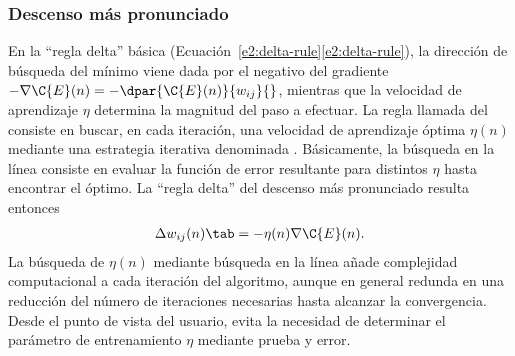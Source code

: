 \subsubsection{Descenso más pronunciado}
%
En la ``regla delta'' básica
(\iflatexml{}Ecuación~\ref{e2:delta-rule}\else\autoref{e2:delta-rule}\fi),
la dirección de búsqueda del mínimo
viene dada por el negativo del gradiente
$-\nabla\C{E}(n)=-\dpar{\C{E}(n)}{w_{ij}}{}$, mientras que la
velocidad de aprendizaje $\eta$ determina la magnitud del paso a
efectuar.
La regla llamada del  consiste
en buscar, en cada iteración, una velocidad de aprendizaje óptima
$\eta(n)$ mediante una estrategia iterativa denominada .  Básicamente, la búsqueda en la línea consiste en evaluar
la función de error resultante para distintos $\eta$ hasta encontrar
el óptimo.  La ``regla delta'' del descenso más pronunciado resulta
entonces
%
\begin{align}\label{e2:delta-rule-steepest}
  \Delta w_{ij}(n)\tab=-\eta(n)\nabla{\C{E}(n)}.
\end{align}
%
La búsqueda de $\eta(n)$ mediante búsqueda en la línea añade
complejidad computacional a cada iteración del algoritmo, aunque en
general redunda en una reducción del número de iteraciones necesarias
hasta alcanzar la convergencia.  Desde el punto de vista del usuario,
evita la necesidad de determinar el parámetro de entrenamiento $\eta$
mediante prueba y error.
%
